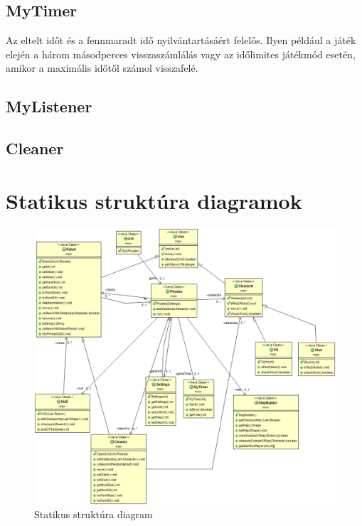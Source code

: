 \subsection{MyTimer}
Az eltelt időt és a fennmaradt idő nyilvántartásáért felelős. Ilyen például a játék elején a három másodperces visszaszámlálás vagy az időlimites játékmód esetén, amikor a maximális időtől számol visszafelé.

\subsection{MyListener}
\subsection{Cleaner}

\section{Statikus struktúra diagramok}

\begin{figure}[h]
\begin{center}
\includegraphics[width=17cm]{images/struktdiagram.PNG}
\caption{Statikus struktúra diagram}
\label{fig:example3}
\end{center}
\end{figure}
\pagebreak


